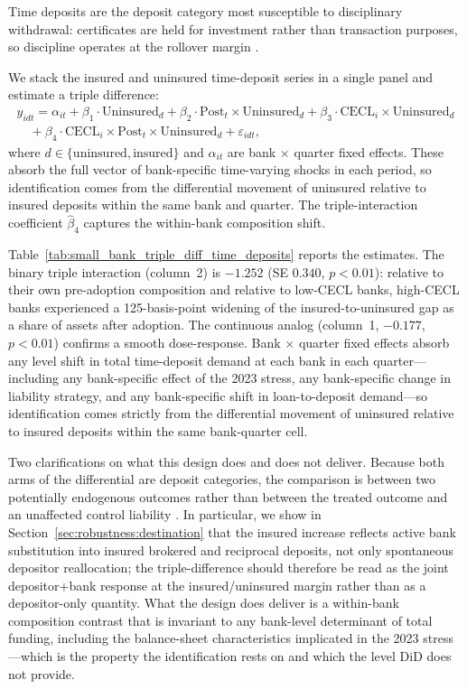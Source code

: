 Time deposits are the deposit category most susceptible to disciplinary
withdrawal: certificates are held for investment rather than transaction
purposes, so discipline operates at the rollover margin
\citep{calomiris1991role, iyer2016tale, maechler2006dynamic,
egan2017deposit}.

We stack the insured and uninsured time-deposit series in a single panel
and estimate a triple difference:
\begin{equation*}
\begin{split}
  y_{idt}
  = \alpha_{it}
  + \beta_1 \cdot \mathrm{Uninsured}_d
  + \beta_2 \cdot \mathrm{Post}_{t} \times \mathrm{Uninsured}_d
  + \beta_3 \cdot \mathrm{CECL}_i \times \mathrm{Uninsured}_d \\
  \quad + \beta_4 \cdot \mathrm{CECL}_i \times \mathrm{Post}_{t} \times \mathrm{Uninsured}_d
  + \varepsilon_{idt},
\end{split}
\end{equation*}
where $d \in \{\text{uninsured}, \text{insured}\}$ and $\alpha_{it}$ are
bank $\times$ quarter fixed effects.  These absorb the full vector of
bank-specific time-varying shocks in each period, so identification comes
from the differential movement of uninsured relative to insured deposits
within the same bank and quarter.  The triple-interaction coefficient
$\hat{\beta}_4$ captures the within-bank composition shift.

Table~\ref{tab:small_bank_triple_diff_time_deposits} reports the estimates.
The binary triple interaction (column~2) is $-1.252$ (SE $0.340$,
$p<0.01$): relative to their own pre-adoption composition and relative to
low-CECL banks, high-CECL banks experienced a 125-basis-point widening of
the insured-to-uninsured gap as a share of assets after adoption.  The
continuous analog (column~1, $-0.177$, $p<0.01$) confirms a smooth
dose-response.  Bank $\times$ quarter fixed effects absorb any level
shift in total time-deposit demand at each bank in each quarter---
including any bank-specific effect of the 2023 stress, any bank-specific
change in liability strategy, and any bank-specific shift in
loan-to-deposit demand---so identification comes strictly from the
differential movement of uninsured relative to insured deposits within
the same bank-quarter cell.

Two clarifications on what this design does and does not deliver.
Because both arms of the differential are deposit categories, the
comparison is between two potentially endogenous outcomes rather than
between the treated outcome and an unaffected control liability
\citep{covitz2004market}.  In particular, we show in
Section~\ref{sec:robustness:destination} that the insured
increase reflects active bank substitution into insured brokered and
reciprocal deposits, not only spontaneous depositor reallocation; the
triple-difference should therefore be read as the joint depositor+bank
response at the insured/uninsured margin rather than as a
depositor-only quantity.  What the design does deliver is a within-bank
composition contrast that is invariant to any bank-level determinant of
total funding, including the balance-sheet characteristics implicated in
the 2023 stress---which is the property the identification rests on and
which the level DiD does not provide.

